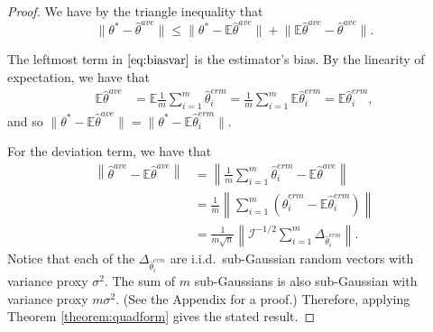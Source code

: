 \documentclass[twoside]{article}
\newcommand{\E}{\mathbb{E}}
\newcommand{\w}{\theta}
\newcommand{\wave}{\hat\w^{ave}}
\newcommand{\wmle}{\hat\w^{erm}}
\newcommand{\wstar}{{\w^{*}}}
\newcommand{\I}{\mathcal I}
\newcommand{\ltwo}[1]{{\lVert {#1} \rVert}}
\newcommand{\ltwobig}[1]{{\left\lVert {#1} \right\rVert}}
\newcommand{\prob}[1]{\Pr\left[{#1}\right]}
\begin{document}
\begin{proof}
We have by the triangle inequality that
\begin{equation}
\ltwo{\wstar-\wave} \le \ltwo{\wstar-\E\wave} + \ltwo{\E\wave-\wave}
.
\label{eq:biasvar}
\end{equation}

The leftmost term in $\eqref{eq:biasvar}$ is the estimator's bias.
By the linearity of expectation, we have that
\begin{align}
\E\wave
&=
\E\frac{1}{m}\sum_{i=1}^m\wmle_i
=
\frac{1}{m}\sum_{i=1}^m\E\wmle_i
=
\E\wmle_i
,
\label{eq:expwave}
\end{align}
and so %
$\ltwo{\wstar-\E\wave}
=
\ltwo{\wstar-\E\wmle_i}
$.

For the deviation term, we have that
\begin{align}
\ltwobig{\wave-\E\wave}
&=
\ltwobig{\frac{1}{m}\sum_{i=1}^m\wmle_i-\E\wave}
\label{eq:var1}
\\&=
\frac{1}{m}\ltwobig{\sum_{i=1}^m\left(\wmle_i-\E\wmle_i\right)}
\\&=
\frac{1}{m\sqrt{n}}\ltwobig{\I^{-1/2}\sum_{i=1}^m\Delta_{\wmle_i}}
\label{eq:var1}
.
\end{align}
Notice that each of the $\Delta_{\wmle_i}$ are i.i.d.\ sub-Gaussian random vectors with variance proxy $\sigma^2$.
The sum of $m$ sub-Gaussians is also sub-Gaussian with variance proxy $m\sigma^2$.
(See the Appendix for a proof.)
Therefore, applying Theorem \ref{theorem:quadform} gives the stated result.
\end{proof}
\end{document}
